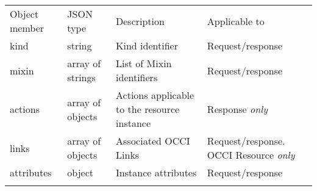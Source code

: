 \documentclass[10pt,a4paper]{article}
\begin{document}
 {
    \begin{tabular}{llp{5.0cm}p{3.0cm}}
    \toprule
    Object member & JSON type & Description & Applicable to \\
    \colrule
    kind & string & Kind identifier & Request/response \\

    mixin & array of strings & List of Mixin identifiers &
    Request/response \\

    actions & array of objects & Actions applicable to the resource instance &
    Response {\em only} \\

    links & array of objects & Associated OCCI Links &
    Request/response. OCCI Resource {\em only} \\

    attributes & object & Instance attributes & Request/response \\
    \botrule
    \end{tabular}
}
\end{document}
